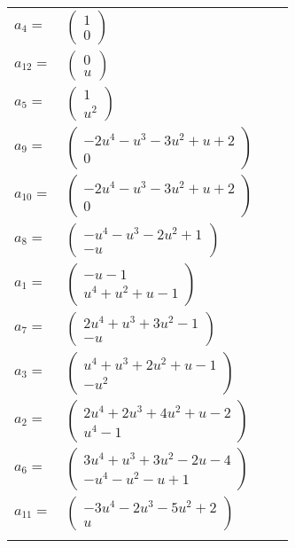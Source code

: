 \documentclass[1p]{elsarticle_modified}
\theoremstyle{definition}
\begin{document}
\begin{tabular}{m{7pt} m{180pt} m{7pt} m{180pt} }
\flushright $a_{4}=$&$\begin{pmatrix}1\\0\end{pmatrix}$ \\
\flushright $a_{12}=$&$\begin{pmatrix}0\\u\end{pmatrix}$ \\
\flushright $a_{5}=$&$\begin{pmatrix}1\\u^2\end{pmatrix}$ \\
\flushright $a_{9}=$&$\begin{pmatrix}-2 u^4- u^3-3 u^2+u+2\\0\end{pmatrix}$ \\
\flushright $a_{10}=$&$\begin{pmatrix}-2 u^4- u^3-3 u^2+u+2\\0\end{pmatrix}$ \\
\flushright $a_{8}=$&$\begin{pmatrix}- u^4- u^3-2 u^2+1\\- u\end{pmatrix}$ \\
\flushright $a_{1}=$&$\begin{pmatrix}- u-1\\u^4+u^2+u-1\end{pmatrix}$ \\
\flushright $a_{7}=$&$\begin{pmatrix}2 u^4+u^3+3 u^2-1\\- u\end{pmatrix}$ \\
\flushright $a_{3}=$&$\begin{pmatrix}u^4+u^3+2 u^2+u-1\\- u^2\end{pmatrix}$ \\
\flushright $a_{2}=$&$\begin{pmatrix}2 u^4+2 u^3+4 u^2+u-2\\u^4-1\end{pmatrix}$ \\
\flushright $a_{6}=$&$\begin{pmatrix}3 u^4+u^3+3 u^2-2 u-4\\- u^4- u^2- u+1\end{pmatrix}$ \\
\flushright $a_{11}=$&$\begin{pmatrix}-3 u^4-2 u^3-5 u^2+2\\u\end{pmatrix}$\\&\end{tabular}
\end{document}
